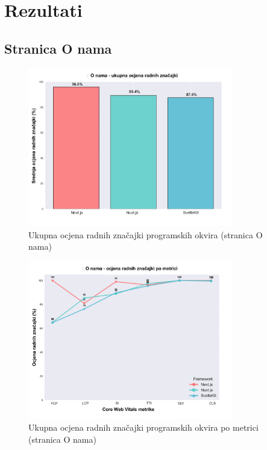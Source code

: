 \section{Rezultati}

\subsection{Stranica O nama}

\begin{figure}[H]
    \centering
    \includegraphics[width=0.8\textwidth]{slike/rezultati/about/about_framework_overall_performance.png}
    \caption{Ukupna ocjena radnih značajki programskih okvira (stranica O nama)}
    \label{fig:testiranje-o-nama-ukupne-performanse}
\end{figure}

\begin{figure}[H]
    \centering
    \includegraphics[width=0.8\textwidth]{slike/rezultati/about/about_performance_by_metric.png}
    \caption{Ukupna ocjena radnih značajki programskih okvira po metrici (stranica O nama)}
    \label{fig:testiranje-o-nama-performanse-po-metrici}
\end{figure}

